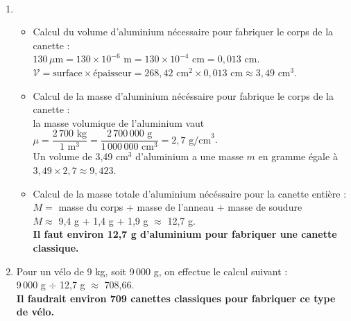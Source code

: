 \ \\ [-5mm]
\begin{enumerate}
   \item
   \begin{itemize}
      \item Calcul du volume d'aluminium nécessaire pour fabriquer le corps de la canette : \\
      $130\,\mu\text{m} =130\times10^{-6}\text{ m} =130\times10^{-4}\text{ cm} =0,013\text{ cm}$. \\
      $\mathcal{V} =\text{surface}\times\text{épaisseur} =268,42\text{ cm}^2\times0,013\text{ cm} \approx 3,49\text{ cm}^3$. \\
      \item Calcul de la masse d'aluminium nécéssaire pour fabrique le corps de la canette : \\ [1mm]
   la masse volumique de l'aluminium vaut $\mu =\dfrac{2\,700\text{ kg}}{1\text{ m}^3} =\dfrac{2\,700\,000\text{ g}}{1\,000\,000\text{ cm}^3} =2,7\text{ g/cm}^3$. \\ [1mm]
   Un volume de 3,49 cm$^3$ d'aluminium a une masse $m$ en gramme égale à $3,49\times2,7 \approx9,423$.
      \item Calcul de la masse totale d'aluminium nécéssaire pour la canette entière : \\
      $M =$ masse du corps + masse de l'anneau + masse de soudure \\
      $M \approx$ 9,4 g + 1,4 g + 1,9 g $\approx$ 12,7 g. \\
      {\bf Il faut environ 12,7 g d'aluminium pour fabriquer une canette classique.}
   \end{itemize}
   \item Pour un vélo de 9 kg, soit 9\,000 g, on effectue le calcul suivant : \\
   9\,000 g $\div$ 12,7 g $\approx$ 708,66. \\
   {\bf Il faudrait environ 709 canettes classiques pour fabriquer ce type de vélo.}
\end{enumerate}
